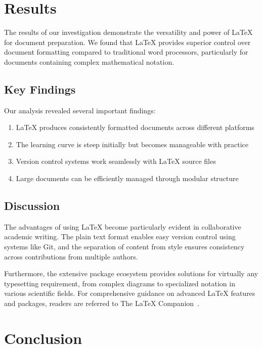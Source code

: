 \documentclass[12pt,a4paper]{article}
\begin{document}
\section{Results}
\label{sec:results}

The results of our investigation demonstrate the versatility and power of LaTeX for document preparation. We found that LaTeX provides superior control over document formatting compared to traditional word processors, particularly for documents containing complex mathematical notation.

\subsection{Key Findings}

Our analysis revealed several important findings:
\begin{enumerate}
    \item LaTeX produces consistently formatted documents across different platforms
    \item The learning curve is steep initially but becomes manageable with practice
    \item Version control systems work seamlessly with LaTeX source files
    \item Large documents can be efficiently managed through modular structure
\end{enumerate}

\subsection{Discussion}

The advantages of using LaTeX become particularly evident in collaborative academic writing. The plain text format enables easy version control using systems like Git, and the separation of content from style ensures consistency across contributions from multiple authors.

Furthermore, the extensive package ecosystem provides solutions for virtually any typesetting requirement, from complex diagrams to specialized notation in various scientific fields. For comprehensive guidance on advanced LaTeX features and packages, readers are referred to The LaTeX Companion~\cite{mittelbach2004}.

\section{Conclusion}
\label{sec:conclusion}
\end{document}
